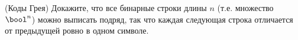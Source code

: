 (Коды Грея) Докажите, что все бинарные строки длины $n$ (т.е. множество $\bool^n$) можно выписать подряд, так что каждая
следующая строка отличается от предыдущей ровно в одном символе.